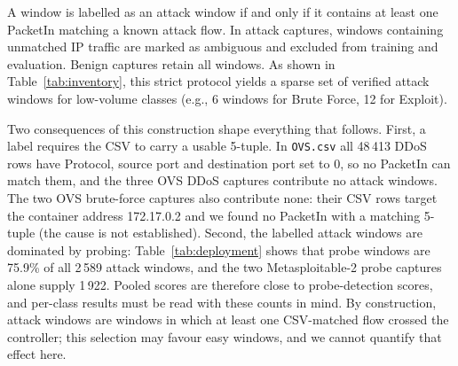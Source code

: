 \documentclass[journal]{IEEEtran}
\begin{document}
A window is labelled as an attack window if and only if it contains at least one PacketIn matching a known attack flow. In attack captures, windows containing unmatched IP traffic are marked as ambiguous and excluded from training and evaluation. Benign captures retain all windows. As shown in Table~\ref{tab:inventory}, this strict protocol yields a sparse set of verified attack windows for low-volume classes (e.g., 6 windows for Brute Force, 12 for Exploit).

Two consequences of this construction shape everything that follows. First, a label requires the CSV to carry a usable 5-tuple. In \texttt{OVS.csv} all 48\,413 DDoS rows have Protocol, source port and destination port set to 0, so no PacketIn can match them, and the three OVS DDoS captures contribute no attack windows. The two OVS brute-force captures also contribute none: their CSV rows target the container address 172.17.0.2 and we found no PacketIn with a matching 5-tuple (the cause is not established). Second, the labelled attack windows are dominated by probing: Table~\ref{tab:deployment} shows that probe windows are 75.9\% of all 2\,589 attack windows, and the two Metasploitable-2 probe captures alone supply 1\,922. Pooled scores are therefore close to probe-detection scores, and per-class results must be read with these counts in mind. By construction, attack windows are windows in which at least one CSV-matched flow crossed the controller; this selection may favour easy windows, and we cannot quantify that effect here.


\end{document}
